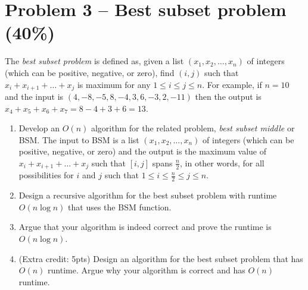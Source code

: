 \documentclass[12pt,letterpaper]{article}
\begin{document}
\newpage


\section*{Problem 3 -- Best subset problem (40\%)}
The \textit{best subset problem} is defined as, given a list $(x_1,x_2,\dots,x_n)$ of integers (which can be positive, negative, or zero), find $(i,j)$ such that $x_i+x_{i+1}+\dots+x_j$ is maximum for any $1\leq i \leq j \leq n$.
For example, if $n = 10$ and the input is $(4,-8,-5,8,-4,3,6,-3,2,-11)$ then the output is $x_4 + x_5 + x_6 + x_7 = 8-4 + 3 + 6 = 13$. 
\begin{enumerate}
    \item Develop an $O(n)$ algorithm for the related problem, \textit{best subset middle} or BSM.
    The input to BSM is a list $(x_1,x_2,\dots,x_n)$ of integers (which can be positive, negative, or zero) and the output is the maximum value of $x_i + x_{i+1} + \dots + x_j$ such that $[i,j]$ spans $\frac{n}{2}$, in other words, for all possibilities for $i$ and $j$ such that $1 \leq i \leq \frac{n}{2} \leq j \leq n$. 
\item Design a recursive algorithm for the best subset problem with runtime $O(n \log n)$ that uses the BSM function.
\item Argue that your algorithm is indeed correct and prove the runtime is $O(n \log n)$.
\item (Extra credit: 5pts) Design an algorithm for the best subset problem that has $O(n)$ runtime. Argue why your algorithm is correct and has $O(n)$ runtime.
\end{enumerate}
\end{document}
